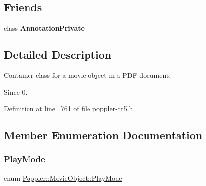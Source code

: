 \subsection*{Friends}
\begin{DoxyCompactItemize}
\item 
\mbox{\label{class_poppler_1_1_movie_object_add0bc3e32e560f9e9eb3025587c1ad54}} 
class {\bfseries Annotation\+Private}
\end{DoxyCompactItemize}


\subsection{Detailed Description}
Container class for a movie object in a P\+DF document.

\begin{DoxySince}{Since}
0. 
\end{DoxySince}


Definition at line 1761 of file poppler-\/qt5.\+h.



\subsection{Member Enumeration Documentation}
\mbox{\label{class_poppler_1_1_movie_object_adeb798fc202760b8fa27d7a8a5a0e9b3}} 
\subsubsection{\texorpdfstring{Play\+Mode}{PlayMode}}
{\footnotesize\ttfamily enum \hyperlink{class_poppler_1_1_movie_object_adeb798fc202760b8fa27d7a8a5a0e9b3}{Poppler\+::\+Movie\+Object\+::\+Play\+Mode}}

